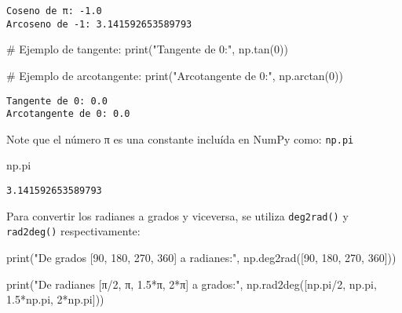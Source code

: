 \documentclass[
  letterpaper,
  DIV=11,
  numbers=noendperiod]{scrreprt}
\newenvironment{Shaded}{\begin{snugshade}}{\end{snugshade}}
\newcommand{\BuiltInTok}[1]{\textcolor[rgb]{0.00,0.23,0.31}{#1}}
\newcommand{\CommentTok}[1]{\textcolor[rgb]{0.37,0.37,0.37}{#1}}
\newcommand{\DecValTok}[1]{\textcolor[rgb]{0.68,0.00,0.00}{#1}}
\newcommand{\FloatTok}[1]{\textcolor[rgb]{0.68,0.00,0.00}{#1}}
\newcommand{\NormalTok}[1]{\textcolor[rgb]{0.00,0.23,0.31}{#1}}
\newcommand{\OperatorTok}[1]{\textcolor[rgb]{0.37,0.37,0.37}{#1}}
\newcommand{\StringTok}[1]{\textcolor[rgb]{0.13,0.47,0.30}{#1}}
\begin{document}
\begin{verbatim}
Coseno de π: -1.0
Arcoseno de -1: 3.141592653589793
\end{verbatim}

\begin{Shaded}
\begin{Highlighting}[]
\CommentTok{\# Ejemplo de tangente:}
\BuiltInTok{print}\NormalTok{(}\StringTok{"Tangente de 0:"}\NormalTok{, np.tan(}\DecValTok{0}\NormalTok{))}

\CommentTok{\# Ejemplo de arcotangente:}
\BuiltInTok{print}\NormalTok{(}\StringTok{"Arcotangente de 0:"}\NormalTok{, np.arctan(}\DecValTok{0}\NormalTok{))}
\end{Highlighting}
\end{Shaded}

\begin{verbatim}
Tangente de 0: 0.0
Arcotangente de 0: 0.0
\end{verbatim}

\begin{tcolorbox}[enhanced jigsaw, opacityback=0, coltitle=black, toptitle=1mm, colframe=quarto-callout-note-color-frame, leftrule=.75mm, colback=white, opacitybacktitle=0.6, toprule=.15mm, breakable, bottomrule=.15mm, rightrule=.15mm, bottomtitle=1mm, titlerule=0mm, title=\textcolor{quarto-callout-note-color}{\faInfo}\hspace{0.5em}{Note}, colbacktitle=quarto-callout-note-color!10!white, left=2mm, arc=.35mm]

Note que el número π es una constante incluída en NumPy como:
\texttt{np.pi}

\end{tcolorbox}

\begin{Shaded}
\begin{Highlighting}[]
\NormalTok{np.pi}
\end{Highlighting}
\end{Shaded}

\begin{verbatim}
3.141592653589793
\end{verbatim}

Para convertir los radianes a grados y viceversa, se utiliza
\texttt{deg2rad()} y \texttt{rad2deg()} respectivamente:

\begin{Shaded}
\begin{Highlighting}[]
\BuiltInTok{print}\NormalTok{(}\StringTok{"De grados [90, 180, 270, 360] a radianes:"}\NormalTok{, }
\NormalTok{      np.deg2rad([}\DecValTok{90}\NormalTok{, }\DecValTok{180}\NormalTok{, }\DecValTok{270}\NormalTok{, }\DecValTok{360}\NormalTok{]))}

\BuiltInTok{print}\NormalTok{(}\StringTok{"De radianes [π/2, π, 1.5*π, 2*π] a grados:"}\NormalTok{, }
\NormalTok{      np.rad2deg([np.pi}\OperatorTok{/}\DecValTok{2}\NormalTok{, np.pi, }\FloatTok{1.5}\OperatorTok{*}\NormalTok{np.pi, }\DecValTok{2}\OperatorTok{*}\NormalTok{np.pi]))}
\end{Highlighting}
\end{Shaded}
\end{document}

